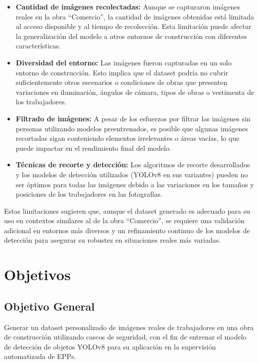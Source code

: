 \begin{itemize}
  \item \textbf{Cantidad de imágenes recolectadas:} Aunque se capturaron imágenes reales en la obra ``Comercio'', la cantidad de imágenes obtenidas está limitada al acceso disponible y al tiempo de recolección. Esta limitación puede afectar la generalización del modelo a otros entornos de construcción con diferentes características.
  \item \textbf{Diversidad del entorno:} Las imágenes fueron capturadas en un solo entorno de construcción. Esto implica que el dataset podría no cubrir suficientemente otros escenarios o condiciones de obras que presenten variaciones en iluminación, ángulos de cámara, tipos de obras o vestimenta de los trabajadores.
  \item \textbf{Filtrado de imágenes:} A pesar de los esfuerzos por filtrar las imágenes sin personas utilizando modelos preentrenados, es posible que algunas imágenes recortadas sigan conteniendo elementos irrelevantes o áreas vacías, lo que puede impactar en el rendimiento final del modelo.
  \item \textbf{Técnicas de recorte y detección:} Los algoritmos de recorte desarrollados y los modelos de detección utilizados (YOLOv8 en sus variantes) pueden no ser óptimos para todas las imágenes debido a las variaciones en los tamaños y posiciones de los trabajadores en las fotografías.
\end{itemize}

Estas limitaciones sugieren que, aunque el dataset generado es adecuado para su uso en contextos similares al de la obra ``Comercio'', se requiere una validación adicional en entornos más diversos y un refinamiento continuo de los modelos de detección para asegurar su robustez en situaciones reales más variadas.

\section{Objetivos}

\subsection{Objetivo General}

Generar un dataset personalizado de imágenes reales de trabajadores en una obra de construcción utilizando cascos de seguridad, con el fin de entrenar el modelo de detección de objetos YOLOv8 para su aplicación en la supervisión automatizada de EPPs.

